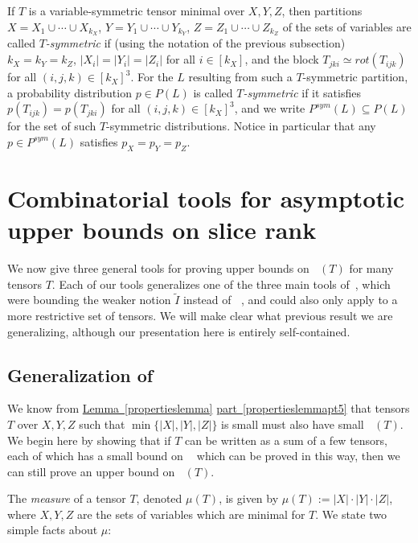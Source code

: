 \documentclass[11pt]{article}
\numberwithin{equation}{section}
\theoremstyle{definition}
\theoremstyle{plain}
\newcommand{\expref}[2]{\hyperref[#2]{#1~\ref{#2}}}
\newcommand{\expeqref}[2]{\hyperref[#2]{#1~\eqref{#2}}}
\newcommand{\tsr}{\mathop{\tilde{\operatorname{S}}}}
\theoremstyle{definition}
\begin{document}
If $T$ is a variable-symmetric tensor minimal over $X,Y,Z$, then partitions $X = X_1 \cup \cdots \cup X_{k_X}$, $Y = Y_1 \cup \cdots \cup Y_{k_Y}$, $Z = Z_1 \cup \cdots \cup Z_{k_Z}$ of the  
%
sets of variables
are called \emph{$T$-symmetric} if (using the notation of the previous subsection) $k_X = k_Y = k_Z$, $|X_i| = |Y_i| = |Z_i|$ for all $i \in [k_X]$, and the block $T_{jki} \simeq rot(T_{ijk})$ for all $(i,j,k) \in [k_X]^3$. For the $L$ resulting from such a $T$-symmetric partition, a probability distribution $p \in P(L)$ is called \emph{$T$-symmetric} if it satisfies $p(T_{ijk}) = p(T_{jki})$ for all $(i,j,k) \in [k_X]^3$, and we write $P^{sym}(L) \subseteq P(L)$ for the set of such $T$-symmetric distributions. Notice in particular that any $p \in P^{sym}(L)$ satisfies $p_X = p_Y = p_Z$.




%
%

\section{Combinatorial tools for asymptotic upper bounds on slice rank}
\label{secthree}

We now give three general tools for proving upper bounds on $\tsr(T)$ for many tensors $T$. Each of our tools generalizes one of the three main tools of~\cite{aw}, which were bounding the weaker notion $\tilde{I}$ instead of $\tsr$, and could also only apply to a more restrictive set of tensors. We will make clear what previous result we are generalizing, although our presentation here is entirely self-contained.

\subsection{Generalization of \cite[Theorem~5.3]{aw}}

We know from \expref{Lemma}{propertieslemma} \expeqref{part}{propertieslemmapt5} that tensors $T$ over $X,Y,Z$ such that $\min\{|X|,|Y|,|Z|\}$ is small must also have small $\tsr(T)$. We begin here by showing that if $T$ can be written as a sum of a few tensors, each of which has a small bound on $\tsr$ which can be proved in this way, then we can still prove an upper bound on $\tsr(T)$. 

The \emph{measure} of a tensor $T$, denoted $\mu(T)$, is given by $\mu(T) := |X| \cdot |Y| \cdot |Z|$, where $X,Y,Z$ are the sets of variables which are minimal for $T$. We state two simple facts about $\mu$:
\end{document}
